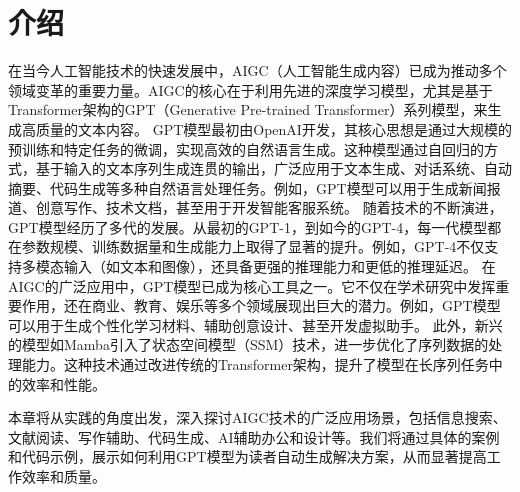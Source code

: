 \section{介绍}\label{sec:intro}




在当今人工智能技术的快速发展中，AIGC（人工智能生成内容）已成为推动多个领域变革的重要力量。AIGC的核心在于利用先进的深度学习模型，尤其是基于Transformer架构的GPT（Generative Pre-trained Transformer）系列模型，来生成高质量的文本内容。
GPT模型最初由OpenAI开发，其核心思想是通过大规模的预训练和特定任务的微调，实现高效的自然语言生成。这种模型通过自回归的方式，基于输入的文本序列生成连贯的输出，广泛应用于文本生成、对话系统、自动摘要、代码生成等多种自然语言处理任务。例如，GPT模型可以用于生成新闻报道、创意写作、技术文档，甚至用于开发智能客服系统。
随着技术的不断演进，GPT模型经历了多代的发展。从最初的GPT-1，到如今的GPT-4，每一代模型都在参数规模、训练数据量和生成能力上取得了显著的提升。例如，GPT-4不仅支持多模态输入（如文本和图像），还具备更强的推理能力和更低的推理延迟。
在AIGC的广泛应用中，GPT模型已成为核心工具之一。它不仅在学术研究中发挥重要作用，还在商业、教育、娱乐等多个领域展现出巨大的潜力。例如，GPT模型可以用于生成个性化学习材料、辅助创意设计、甚至开发虚拟助手。
此外，新兴的模型如Mamba引入了状态空间模型（SSM）技术，进一步优化了序列数据的处理能力。这种技术通过改进传统的Transformer架构，提升了模型在长序列任务中的效率和性能。

本章将从实践的角度出发，深入探讨AIGC技术的广泛应用场景，包括信息搜索、文献阅读、写作辅助、代码生成、AI辅助办公和设计等。我们将通过具体的案例和代码示例，展示如何利用GPT模型为读者自动生成解决方案，从而显著提高工作效率和质量。




